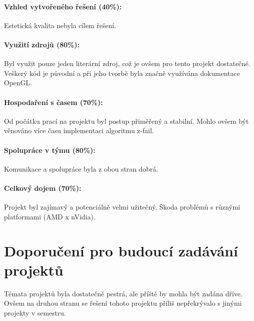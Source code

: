\documentclass[11pt,a4paper]{article}
\begin{document}
\paragraph{Vzhled vytvořeného řešení (40\%):} 
Estetická kvalita nebyla cílem řešení.

\paragraph{Využití zdrojů (80\%):} 
Byl využit pouze jeden literární zdroj, což je ovšem pro tento projekt dostatečné. Veškerý kód je původní a při jeho tvorbě byla značně využívána dokumentace OpenGL.

\paragraph{Hospodaření s časem (70\%):} 
Od počátku prací na projektu byl postup přiměřený a stabilní. Mohlo ovšem být věnováno více času implementaci algoritmu z-fail.

\paragraph{Spolupráce v týmu (80\%):}
Komunikace a spolupráce byla z obou stran dobrá.

\paragraph{Celkový dojem (70\%):}
Projekt byl zajímavý a potenciálně velmi užitečný. Škoda problémů s různými platformami (AMD x nVidia).

\section{Doporučení pro budoucí zadávání projektů}

Témata projektů byla dostatečně pestrá, ale příště by mohla být zadána dříve. Ovšem na druhou stranu se řešení tohoto projektu příliš nepřekrývalo s jinými projekty v semestru.

\end{document}
